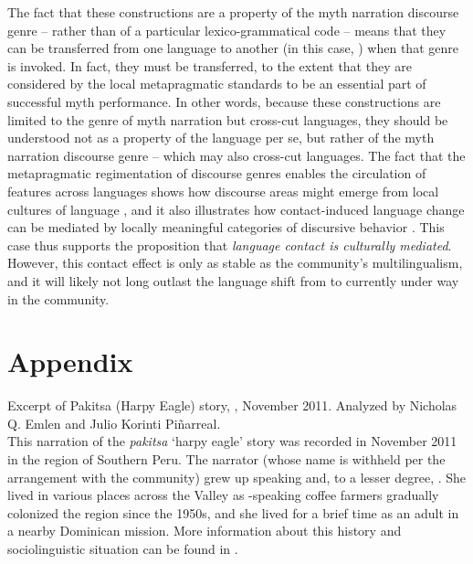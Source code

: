 \documentclass[output=paper]{LSP/langsci}
\begin{document}
The fact that these constructions are a property of the myth narration discourse genre – rather than of a particular lexico-grammatical code – means that they can be transferred from one language to another (in this case, ) when that genre is invoked. In fact, they must be transferred, to the extent that they are considered by the local metapragmatic standards to be an essential part of successful myth performance. In other words, because these constructions are limited to the genre of myth narration but cross-cut languages, they should be understood not as a property of the  language per se, but rather of the myth narration discourse genre – which may also cross-cut languages. The fact that the metapragmatic regimentation of discourse genres enables the circulation of features across languages shows how discourse areas might emerge from local cultures of language \citep[as in ;][]{beieretal.2002}, and it also illustrates how contact-induced language change can be mediated by locally meaningful categories of discursive behavior \citep[i.e., ‘culture’;][]{silverstein76}. This case thus supports the proposition that \textit{language contact is culturally mediated}. However, this contact effect is only as stable as the community’s multilingualism, and it will likely not long outlast the language shift from  to  currently under way in the community.
%



%
\section*{Appendix}
 \setcounter{equation}{0}
Excerpt of Pakitsa (Harpy Eagle) story,  , November 2011. Analyzed by Nicholas Q. Emlen and Julio Korinti Piñarreal.\\

This narration of the  \textit{pakitsa} `harpy eagle' story was recorded in November 2011 in the  region of Southern Peru. The narrator (whose name is withheld per the arrangement with the community) grew up speaking  and, to a lesser degree, . She lived in various places across the  Valley as -speaking coffee farmers gradually colonized the region since the 1950s, and she lived for a brief time as an adult in a nearby Dominican mission. More information about this history and sociolinguistic situation can be found in \citet{emlen14,emlen.2015,emlen.2017,emlenforth}.
\end{document}
